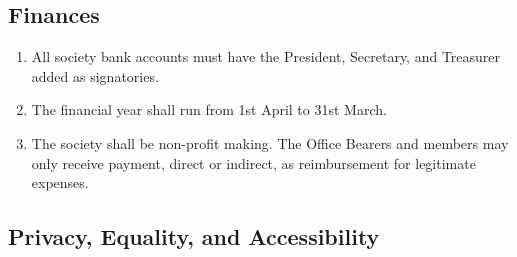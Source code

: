 \subsection{Finances}

\begin{enumerate}
    \item All society bank accounts must have the President, Secretary, and Treasurer added as signatories.

    \item The financial year shall run from 1st April to 31st March.
    
    \item The society shall be non-profit making. The Office Bearers and members may only receive payment, direct or indirect, as reimbursement for legitimate expenses.
    
\end{enumerate}


\subsection{Privacy, Equality, and Accessibility}

